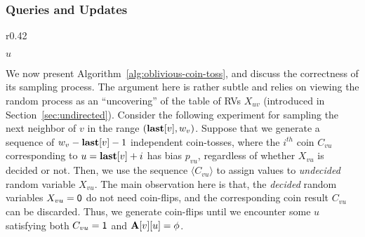 \subsubsection{Queries and Updates}
\label{sec:nn-correctness}
\begin{wrapfigure}[13]{r}{0.42\textwidth}
\vspace{-3em}
\begin{framed}
    \renewcommand\figurename{Algorithm}
    \caption{Sampling }
    \label{alg:oblivious-coin-toss}
    \begin{algorithmic}[1]
            \State{$w_v \gets \min \{(P_v \cap (u, n]) \cup \{n+1\}\}$}
            \Repeat
            \EndIf
            \State \Return $u$
        \EndProcedure
    \end{algorithmic}
\end{framed}
\end{wrapfigure}
We now present Algorithm~\ref{alg:oblivious-coin-toss}, and discuss the correctness of its sampling process.
The argument here is rather subtle and relies on viewing the random process as an ``uncovering'' of the table of RVs $X_{uv}$
(introduced in Section~\ref{sec:undirected}).
Consider the following experiment for sampling the next neighbor of $v$ in the range $(\mathbf{last}[v],w_v)$.
Suppose that we generate a sequence of $w_v-\mathbf{last}[v]-1$ independent coin-tosses,
where the $i^{th}$ coin $C_{vu}$ corresponding to $u = \mathbf{last}[v]+i$ has bias $p_{vu}$, regardless of whether $X_{vu}$ is decided or not.
Then, we use the sequence $\langle C_{vu} \rangle$ to assign values to \emph{undecided} random variable $X_{vu}$.
The main observation here is that, the \emph{decided} random variables $X_{vu} = \mathsf{0}$ do not need coin-flips,
and the corresponding coin result $C_{vu}$ can be discarded.
Thus, we generate coin-flips until we encounter some $u$ satisfying both $C_{vu} = \mathsf{1}$ and $\mathbf{A}[v][u] = \phi$.

